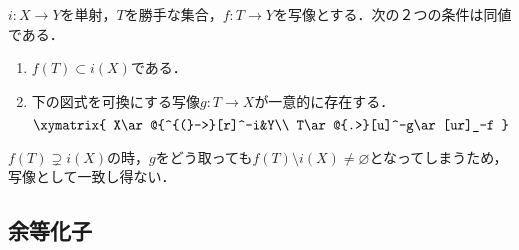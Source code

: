 \documentclass[uplatex,dvipdfmx]{jsreport}
\begin{document}
\begin{proposition}
    $i:X\to Y$を単射，$T$を勝手な集合，$f:T\to Y$を写像とする．次の２つの条件は同値である．
    \begin{enumerate}
        \item $f(T)\subset i(X)$である．
        \item 下の図式を可換にする写像$g:T\to X$が一意的に存在する．
        \[\xymatrix{
            X\ar@{^{(}->}[r]^-i&Y\\
            T\ar@{.>}[u]^-g\ar[ur]_-f
        }\]
    \end{enumerate}
\end{proposition}
\begin{remarks}
    $f(T)\supsetneq i(X)$の時，$g$をどう取っても$f(T)\setminus i(X)\ne\varnothing$となってしまうため，写像として一致し得ない．
\end{remarks}

\subsection{余等化子}
\end{document}

